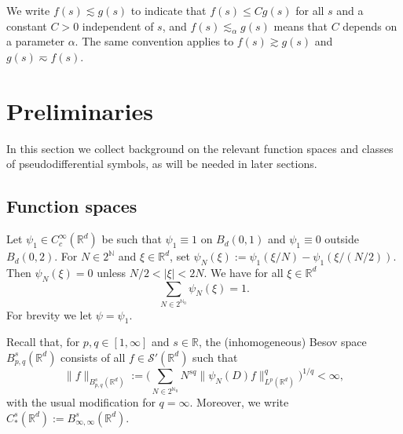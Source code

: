 \documentclass{amsart}
\numberwithin{equation}{section}
\theoremstyle{definition}
\newcommand{\R}{\mathbb{R}}
\newcommand{\Rd}{\mathbb{R}^{d}}
\newcommand{\N}{\mathbb{N}}
\newcommand {\Sw}{\mathcal{S}}
\begin{document}
We write $f(s)\lesssim g(s)$ to indicate that $f(s)\leq Cg(s)$ for all $s$ and a constant $C>0$ independent of $s$, and $f(s)\lesssim_{\alpha} g(s)$ means that $C$ depends on a parameter $\alpha$. The same convention applies to $f(s)\gtrsim g(s)$ and $g(s)\eqsim f(s)$.


\section{Preliminaries}\label{sec:Preliminaries}
In this section we collect background on the relevant function spaces and classes of pseudodifferential symbols, as will be needed in later sections.

\subsection{Function spaces}\label{subsec:spaces}

Let 
$\psi_1 \in C^\infty_c(\R^d)$ 
be such that $\psi_1 \equiv 1$ on $B_d(0,1)$ and $\psi_1 \equiv 0$ outside $B_d(0,2)$. For $N\in 2^{\N}$ and $\xi\in\Rd$, set $\psi_N(\xi) := \psi_1(\xi/N) - \psi_1(\xi/(N/2))$. Then $\psi_{N}(\xi)=0$ unless 
$N/2<|\xi|<2N$. We have for all $\xi\in\Rd$
\begin{equation}\label{eq:LittlePaley}
\sum_{N \in 2^{\N_0}} \psi_N(\xi) =1.
\end{equation}
For brevity we let $\psi = \psi_1$.

Recall that, for $p,q\in[1,\infty]$ and $s\in\R$, the (inhomogeneous) Besov space $B^{s}_{p,q}(\Rd)$ consists of all $f\in\Sw'(\Rd)$ such that 
\begin{equation*}
    \| f \|_{B^s_{p,q}(\R^d)}:= \Big(\sum_{N\in 2^{\N_0}} N^{sq} \|\psi_{N}(D) f \|_{L^p(\R^d)}^q  \Big)^{1/q}<\infty,
\end{equation*}
with the usual modification for $q = \infty$. Moreover, we write $C^{s}_{*}(\Rd):=B^{s}_{\infty,\infty}(\Rd)$. 
\end{document}
